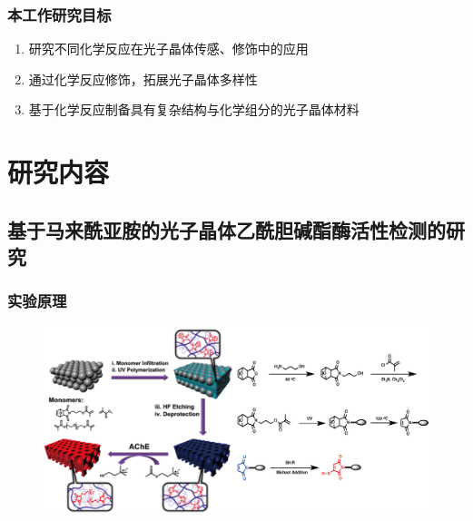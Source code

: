 \documentclass{beamer}
\begin{document}
\begin{frame}
  \frametitle{本工作研究目标}
  \begin{enumerate}
    \item
     研究不同化学反应在光子晶体传感、修饰中的应用
    \item
     通过化学反应修饰，拓展光子晶体多样性
    \item
     基于化学反应制备具有复杂结构与化学组分的光子晶体材料
  \end{enumerate}
\end{frame}

\section{研究内容}




\subsection{基于马来酰亚胺的光子晶体乙酰胆碱酯酶活性检测的研究}
\begin{frame}
  \frametitle{实验原理}
  \begin{figure}[htbp]
    \centering
    \includegraphics[width=\linewidth]{figures/AChE-Principle.png}
  \end{figure}
\end{frame}
\end{document}
